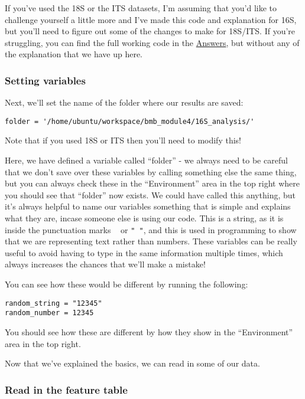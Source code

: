 \documentclass[
]{book}
\begin{document}
If you've used the 18S or the ITS datasets, I'm assuming that you'd like to challenge yourself a little more and I've made this code and explanation for 16S, but you'll need to figure out some of the changes to make for 18S/ITS. If you're struggling, you can find the full working code in the \hyperref[answers]{Answers}, but without any of the explanation that we have up here.

\subsubsection{Setting variables}\label{setting-variables}

Next, we'll set the name of the folder where our results are saved:

\begin{verbatim}
folder = '/home/ubuntu/workspace/bmb_module4/16S_analysis/'
\end{verbatim}

Note that if you used 18S or ITS then you'll need to modify this!

Here, we have defined a variable called ``folder'' - we always need to be careful that we don't save over these variables by calling something else the same thing, but you can always check these in the ``Environment'' area in the top right where you should see that ``folder'' now exists. We could have called this anything, but it's always helpful to name our variables something that is simple and explains what they are, incase someone else is using our code. This is a string, as it is inside the punctuation marks \texttt{\textquotesingle{}\ \textquotesingle{}} or \texttt{"\ "}, and this is used in programming to show that we are representing text rather than numbers. These variables can be really useful to avoid having to type in the same information multiple times, which always increases the chances that we'll make a mistake!

You can see how these would be different by running the following:

\begin{verbatim}
random_string = "12345"
random_number = 12345
\end{verbatim}

You should see how these are different by how they show in the ``Environment'' area in the top right.

Now that we've explained the basics, we can read in some of our data.

\subsubsection{Read in the feature table}\label{read-in-the-feature-table}
\end{document}
